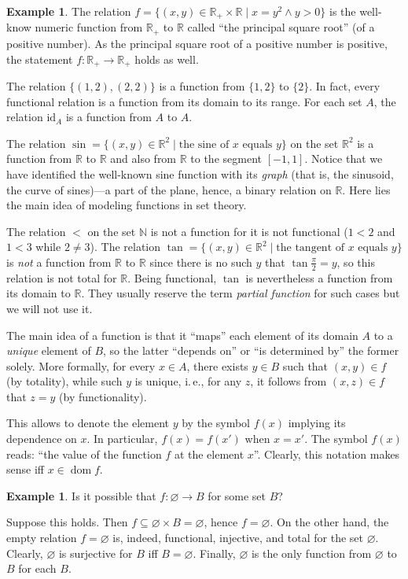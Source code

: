\documentclass[12pt,notitlepage]{article}
\theoremstyle{plain}
\theoremstyle{definition}
\newtheorem{exm}[thm]{Example}
\theoremstyle{plain}
\newcommand{\N}{\mathbb{N}}
\newcommand{\R}{\mathbb{R}}
\newcommand{\sbs}{\subseteq}
\newcommand{\void}{\varnothing}
\newcommand{\dom}{\mathop{\mathrm{dom}}}
\newcommand{\id}{\mathrm{id}}
\newcommand{\1}{\mathbf{1}}
\newcommand{\0}{\mathbf{0}}
\begin{document}
\begin{exm}
The relation $f = \{(x,y) \in \R_+ \times \R \mid x = y^2 \wedge y > 0 \}$ is the well-know numeric function from $\R_+$ to $\R$ called ``the principal square root'' (of a positive number). As the principal square root of a positive number is positive, the statement $f\colon \R_+ \to \R_+$ holds as well.

The relation $\{ (1,2), (2,2) \}$ is a function from $\{1, 2\}$ to $\{2\}$. In fact, every functional relation is a function from its domain to its range. For each set $A$, the relation $\id_A$ is a function from $A$ to $A$.

The relation $\sin = \{ (x, y) \in \R^2 \mid \mbox{the sine of $x$ equals $y$} \}$ on the set $\R^2$ is a function from $\R$ to $\R$ and also from $\R$ to the segment $[-1, 1]$. Notice that we have identified the well-known sine function with its \emph{graph} (that is, the sinusoid, the curve of sines)---a part of the plane, hence, a binary relation on $\R$. Here lies the main idea of modeling functions in set theory.

The relation $<$ on the set $\N$ is not a function for it is not functional ($1 < 2$ and $1 < 3$ while $2 \neq 3$). The relation $\tan = \{ (x, y) \in \R^2 \mid \mbox{the tangent of $x$ equals $y$} \}$ is \emph{not} a function from $\R$ to $\R$ since there is no such $y$ that $\tan \frac{\pi}{2} = y$, so this relation is not total for $\R$. Being functional, $\tan$ is nevertheless a function from its domain to $\R$. They usually reserve the term \emph{partial function} for such cases but we will not use it.
\end{exm}

The main idea of a function is that it ``maps'' each element of its domain $A$ to a \emph{unique} element of $B$, so the latter ``depends on'' or ``is determined by'' the former solely. More formally, for every $x \in A$, there exists $y \in B$ such that $(x,y) \in f$ (by totality), while such $y$ is unique, i.\,e., for any $z$, it follows from $(x,z) \in f$ that $z = y$ (by functionality).

This allows to denote the element $y$ by the symbol $f(x)$ implying its dependence on $x$. In particular, $f(x) = f(x')$ when $x = x'$. The symbol $f(x)$ reads: ``the value of the function $f$ at the element $x$''. Clearly, this notation makes sense iff $x \in \dom f$.


\begin{exm}\label{ch0:void_fnc}
Is it possible that $f\colon \void \to B$ for some set $B$?

Suppose this holds. Then $f \sbs \void \times B = \void$, hence $f = \void$. On the other hand, the empty relation $f = \void$ is, indeed, functional, injective, and total for the set $\void$. Clearly, $\void$ is surjective for $B$ iff $B = \void$. Finally, $\void$ is the only function from $\void$ to $B$ for each $B$.
\end{exm}
\end{document}

